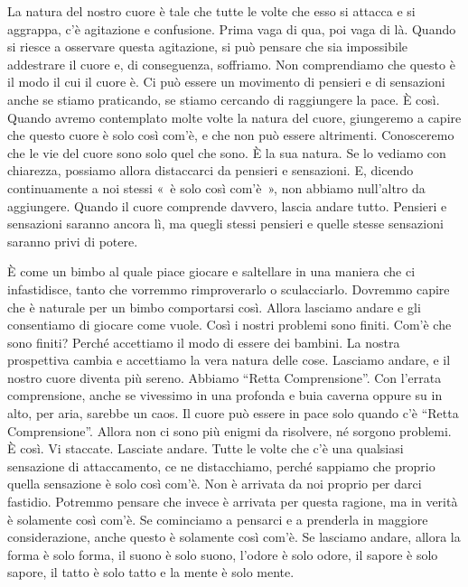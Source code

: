 La natura del nostro cuore è tale che tutte le volte che esso si attacca
e si aggrappa, c'è agitazione e confusione. Prima vaga di qua, poi vaga
di là. Quando si riesce a osservare questa agitazione, si può pensare
che sia impossibile addestrare il cuore e, di conseguenza, soffriamo.
Non comprendiamo che questo è il modo il cui il cuore è. Ci può essere
un movimento di pensieri e di sensazioni anche se stiamo praticando, se
stiamo cercando di raggiungere la pace. È così. Quando avremo
contemplato molte volte la natura del cuore, giungeremo a capire che
questo cuore è solo così com'è, e che non può essere altrimenti.
Conosceremo che le vie del cuore sono solo quel che sono. È la sua
natura. Se lo vediamo con chiarezza, possiamo allora distaccarci da
pensieri e sensazioni. E, dicendo continuamente a noi stessi «~è solo
così com'è~», non abbiamo null'altro da aggiungere. Quando il cuore
comprende davvero, lascia andare tutto. Pensieri e sensazioni saranno
ancora lì, ma quegli stessi pensieri e quelle stesse sensazioni saranno
privi di potere.

È come un bimbo al quale piace giocare e saltellare in una maniera che
ci infastidisce, tanto che vorremmo rimproverarlo o sculacciarlo.
Dovremmo capire che è naturale per un bimbo comportarsi così. Allora
lasciamo andare e gli consentiamo di giocare come vuole. Così i nostri
problemi sono finiti. Com'è che sono finiti? Perché accettiamo il modo
di essere dei bambini. La nostra prospettiva cambia e accettiamo la vera
natura delle cose. Lasciamo andare, e il nostro cuore diventa più
sereno. Abbiamo ``Retta Comprensione''. Con l'errata comprensione, anche
se vivessimo in una profonda e buia caverna oppure su in alto, per aria,
sarebbe un caos. Il cuore può essere in pace solo quando c'è ``Retta
Comprensione''. Allora non ci sono più enigmi da risolvere, né sorgono
problemi. È così. Vi staccate. Lasciate andare. Tutte le volte che c'è
una qualsiasi sensazione di attaccamento, ce ne distacchiamo, perché
sappiamo che proprio quella sensazione è solo così com'è. Non è arrivata
da noi proprio per darci fastidio. Potremmo pensare che invece è
arrivata per questa ragione, ma in verità è solamente così com'è. Se
cominciamo a pensarci e a prenderla in maggiore considerazione, anche
questo è solamente così com'è. Se lasciamo andare, allora la forma è
solo forma, il suono è solo suono, l'odore è solo odore, il sapore è
solo sapore, il tatto è solo tatto e la mente è solo mente.

